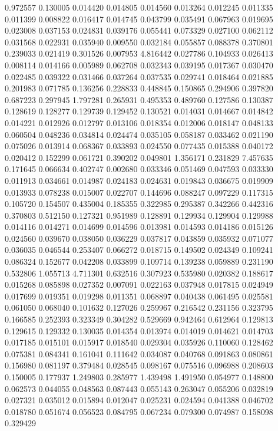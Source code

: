 0.972557
0.130005
0.014420
0.014805
0.014560
0.013264
0.012245
0.011335
0.011399
0.008822
0.016417
0.014745
0.043799
0.035491
0.067963
0.019695
0.023008
0.037153
0.024831
0.039176
0.055441
0.073329
0.027100
0.062112
0.031568
0.022931
0.035940
0.009550
0.032184
0.055857
0.088378
0.370801
0.239033
0.021419
0.301526
0.007953
4.816442
0.027786
0.104933
0.026413
0.008114
0.014166
0.005989
0.062708
0.032343
0.039195
0.017367
0.030470
0.022485
0.039322
0.031466
0.037264
0.037535
0.029741
0.018464
0.021885
0.201983
0.071785
0.136256
0.228833
0.448845
0.150865
0.294906
0.397820
0.687223
0.297945
1.797281
0.265931
0.495353
0.489760
0.127586
0.130387
0.128619
0.128277
0.129739
0.129452
0.130521
0.014031
0.014667
0.014842
0.014221
0.012926
0.012797
0.013106
0.018354
0.012006
0.018147
0.048133
0.060504
0.048236
0.034814
0.024474
0.035105
0.058187
0.033462
0.021190
0.075026
0.013914
0.068367
0.033893
0.024550
0.077435
0.015388
0.040172
0.020412
0.152299
0.061721
0.390202
0.049801
1.356171
0.231829
7.457635
0.171645
0.066634
0.402747
0.002680
0.033346
0.051469
0.047593
0.033330
0.011913
0.034661
0.014987
0.024183
0.024631
0.019843
0.036675
0.019909
0.013933
0.078238
0.015007
0.022707
0.144696
0.088247
0.097229
0.117315
0.105720
0.154507
0.435004
0.185355
0.322985
0.295387
0.342266
0.442316
0.370803
0.512150
0.127321
0.951989
0.128891
0.129934
0.129904
0.129988
0.014116
0.014271
0.014699
0.014596
0.013981
0.014593
0.014186
0.015126
0.024560
0.039670
0.038050
0.036229
0.037817
0.043859
0.035932
0.071077
0.036035
0.046544
0.253407
0.066272
0.018715
0.149502
0.024349
0.109241
0.086324
0.152677
0.042208
0.033899
0.109714
0.139238
0.059889
0.231190
0.532806
1.055713
4.711301
0.632516
0.307923
0.535980
0.020382
0.188617
0.015268
0.085898
0.027352
0.007091
0.022163
0.037948
0.017815
0.024949
0.017699
0.019351
0.019298
0.011351
0.068897
0.040438
0.061495
0.025581
0.061050
0.068040
0.101632
0.127026
0.259967
0.216542
0.231156
0.323795
0.166585
0.252393
0.323349
0.304282
0.529669
0.942464
0.612964
0.129813
0.129615
0.129332
0.130035
0.014354
0.013974
0.014019
0.014621
0.014703
0.017185
0.015101
0.015917
0.018540
0.029304
0.035926
0.110060
0.128462
0.075381
0.084341
0.161041
0.111642
0.034087
0.040768
0.091863
0.080861
0.156980
0.081197
0.379484
0.028545
0.098167
0.075516
0.096988
0.208603
0.150005
0.177937
1.249803
0.285977
1.439498
1.491950
0.054977
0.148800
0.062573
0.044055
0.048563
0.087443
0.055143
0.263047
0.055206
0.032819
0.027321
0.035012
0.015894
0.012047
0.025231
0.024594
0.041388
0.046702
0.018780
0.051674
0.056523
0.084795
0.067234
0.079300
0.074987
0.158098
0.329429
